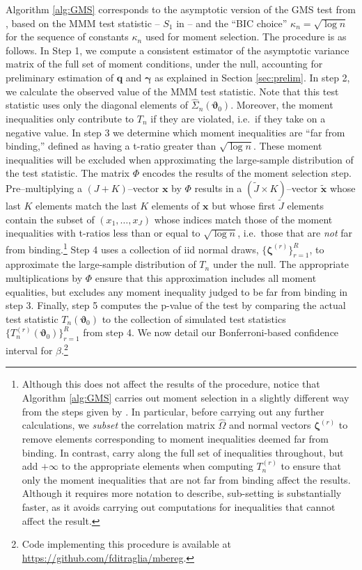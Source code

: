 Algorithm \ref{alg:GMS} corresponds to the asymptotic version of the GMS test from \cite{AndrewsSoares}, based on the MMM test statistic -- $S_1$ in \cite{AndrewsSoares} -- and the ``BIC choice'' $\kappa_n = \sqrt{\log n}$ for the sequence of constants $\kappa_n$ used for moment selection.   
The procedure is as follows.
In Step 1, we compute a consistent estimator of the asymptotic variance matrix of the full set of moment conditions, under the null, accounting for preliminary estimation of $\mathbf{q}$ and $\boldsymbol{\gamma}$ as explained in Section \ref{sec:prelim}.
In step 2, we calculate the observed value of the MMM test statistic.
Note that this test statistic uses only the diagonal elements of $\widehat{\Sigma}_n(\boldsymbol{\vartheta}_0)$.
Moreover, the moment inequalities only contribute to $T_n$ if they are violated, i.e.\ if they take on a negative value.
In step 3 we determine which moment inequalities are ``far from binding,'' defined as having a t-ratio greater than $\sqrt{\log n}$.
These moment inequalities will be excluded when approximating the large-sample distribution of the test statistic.
The matrix $\Phi$ encodes the results of the moment selection step.
Pre--multiplying a $(J + K)$--vector $\mathbf{x}$ by $\Phi$ results in a $(\widetilde{J}\times K)$--vector $\widetilde{\mathbf{x}}$ whose last $K$ elements match the last $K$ elements of $\mathbf{x}$ but whose first $\widetilde{J}$ elements contain the subset of $(x_1, \dots, x_J)$ whose indices match those of the moment inequalities with t-ratios less than or equal to $\sqrt{\log n}$, i.e.\ those that are \emph{not} far from binding.\footnote{Although this does not affect the results of the procedure, notice that Algorithm \ref{alg:GMS} carries out moment selection in a slightly different way from the steps given by \cite{AndrewsSoares}. In particular, before carrying out any further calculations, we \emph{subset} the correlation matrix $\widehat{\Omega}$ and normal vectors $\boldsymbol{\zeta}^{(r)}$ to remove elements corresponding to moment inequalities deemed far from binding. In contrast, \cite{AndrewsSoares} carry along the full set of inequalities throughout, but add $+\infty$ to the appropriate elements when computing $T_n^{(r)}$ to ensure that only the moment inequalities that are not far from binding affect the results. Although it requires more notation to describe, sub-setting is substantially faster, as it avoids carrying out computations for inequalities that cannot affect the result.}
Step 4 uses a collection of iid normal draws, $\{\boldsymbol{\zeta}^{(r)}\}_{r=1}^{R}$, to approximate the large-sample distribution of $T_n$ under the null.
The appropriate multiplications by $\Phi$ ensure that this approximation includes all moment equalities, but excludes any moment inequality judged to be far from binding in step 3.
Finally, step 5 computes the p-value of the test by comparing the actual test statistic $T_n(\boldsymbol{\vartheta}_0)$ to the collection of simulated test statistics $\{T_n^{(r)}(\boldsymbol{\vartheta}_0)\}_{r=1}^R$ from step 4.
We now detail our Bonferroni-based confidence interval for $\beta$.\footnote{Code implementing this procedure is available at \url{https://github.com/fditraglia/mbereg}.} 


